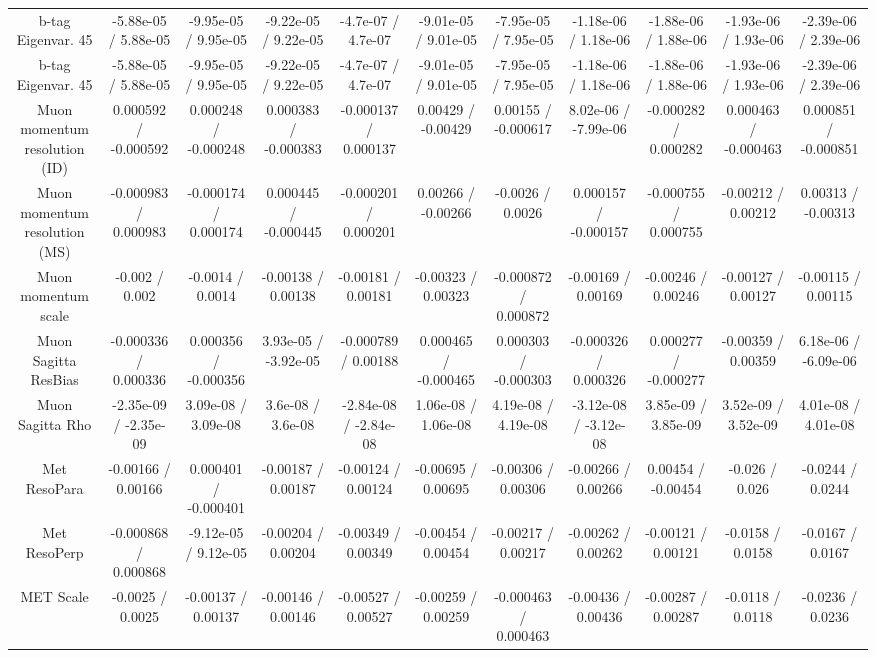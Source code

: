 \begin{table}[htbp]
\begin{center}
\begin{tabular}{|c|c|c|c|c|c|c|c|c|c|c|}
  b-tag Eigenvar. 45 & -5.88e-05 / 5.88e-05 & -9.95e-05 / 9.95e-05 & -9.22e-05 / 9.22e-05 & -4.7e-07 / 4.7e-07 & -9.01e-05 / 9.01e-05 & -7.95e-05 / 7.95e-05 & -1.18e-06 / 1.18e-06 & -1.88e-06 / 1.88e-06 & -1.93e-06 / 1.93e-06 & -2.39e-06 / 2.39e-06 \\ 
  b-tag Eigenvar. 45 & -5.88e-05 / 5.88e-05 & -9.95e-05 / 9.95e-05 & -9.22e-05 / 9.22e-05 & -4.7e-07 / 4.7e-07 & -9.01e-05 / 9.01e-05 & -7.95e-05 / 7.95e-05 & -1.18e-06 / 1.18e-06 & -1.88e-06 / 1.88e-06 & -1.93e-06 / 1.93e-06 & -2.39e-06 / 2.39e-06 \\ 
  Muon momentum resolution (ID) & 0.000592 / -0.000592 & 0.000248 / -0.000248 & 0.000383 / -0.000383 & -0.000137 / 0.000137 & 0.00429 / -0.00429 & 0.00155 / -0.000617 & 8.02e-06 / -7.99e-06 & -0.000282 / 0.000282 & 0.000463 / -0.000463 & 0.000851 / -0.000851 \\ 
  Muon momentum resolution (MS) & -0.000983 / 0.000983 & -0.000174 / 0.000174 & 0.000445 / -0.000445 & -0.000201 / 0.000201 & 0.00266 / -0.00266 & -0.0026 / 0.0026 & 0.000157 / -0.000157 & -0.000755 / 0.000755 & -0.00212 / 0.00212 & 0.00313 / -0.00313 \\ 
  Muon momentum scale & -0.002 / 0.002 & -0.0014 / 0.0014 & -0.00138 / 0.00138 & -0.00181 / 0.00181 & -0.00323 / 0.00323 & -0.000872 / 0.000872 & -0.00169 / 0.00169 & -0.00246 / 0.00246 & -0.00127 / 0.00127 & -0.00115 / 0.00115 \\ 
  Muon Sagitta ResBias & -0.000336 / 0.000336 & 0.000356 / -0.000356 & 3.93e-05 / -3.92e-05 & -0.000789 / 0.00188 & 0.000465 / -0.000465 & 0.000303 / -0.000303 & -0.000326 / 0.000326 & 0.000277 / -0.000277 & -0.00359 / 0.00359 & 6.18e-06 / -6.09e-06 \\ 
  Muon Sagitta Rho & -2.35e-09 / -2.35e-09 & 3.09e-08 / 3.09e-08 & 3.6e-08 / 3.6e-08 & -2.84e-08 / -2.84e-08 & 1.06e-08 / 1.06e-08 & 4.19e-08 / 4.19e-08 & -3.12e-08 / -3.12e-08 & 3.85e-09 / 3.85e-09 & 3.52e-09 / 3.52e-09 & 4.01e-08 / 4.01e-08 \\ 
  Met ResoPara & -0.00166 / 0.00166 & 0.000401 / -0.000401 & -0.00187 / 0.00187 & -0.00124 / 0.00124 & -0.00695 / 0.00695 & -0.00306 / 0.00306 & -0.00266 / 0.00266 & 0.00454 / -0.00454 & -0.026 / 0.026 & -0.0244 / 0.0244 \\ 
  Met ResoPerp & -0.000868 / 0.000868 & -9.12e-05 / 9.12e-05 & -0.00204 / 0.00204 & -0.00349 / 0.00349 & -0.00454 / 0.00454 & -0.00217 / 0.00217 & -0.00262 / 0.00262 & -0.00121 / 0.00121 & -0.0158 / 0.0158 & -0.0167 / 0.0167 \\ 
  MET Scale & -0.0025 / 0.0025 & -0.00137 / 0.00137 & -0.00146 / 0.00146 & -0.00527 / 0.00527 & -0.00259 / 0.00259 & -0.000463 / 0.000463 & -0.00436 / 0.00436 & -0.00287 / 0.00287 & -0.0118 / 0.0118 & -0.0236 / 0.0236 \\ 

\end{tabular}
\end{center}
\end{table}
